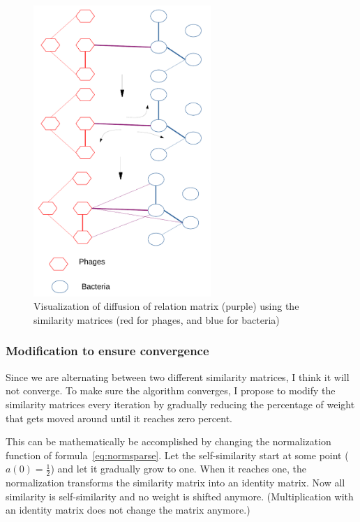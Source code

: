 \documentclass{article}
\begin{document}
\begin{figure}[hb]
    \centering
    \includegraphics[width=0.6\textwidth]{img/phage-bac-diffusion_cropped.pdf}
    \caption{Visualization of diffusion of relation matrix (purple) using the similarity matrices (red for phages, and blue for bacteria)}\label{fig:phagediff}
\end{figure}

\subsubsection{Modification to ensure convergence}

Since we are alternating between two different similarity matrices,
I think it will not converge.
To make sure the algorithm converges, I propose to modify the
similarity matrices every iteration by gradually reducing the percentage of weight
that gets moved around until it reaches zero percent.

This can be mathematically be accomplished by changing the normalization
function of formula~\ref{eq:normsparse}.
Let the self-similarity start at some point ($a(0) = \frac{1}{2}$) 
and let it gradually grow to one. 
When it reaches one, the normalization transforms the similarity matrix into
an identity matrix. Now all similarity is self-similarity 
and no weight is shifted anymore. 
(Multiplication with an identity matrix does not change the matrix anymore.)
\end{document}
